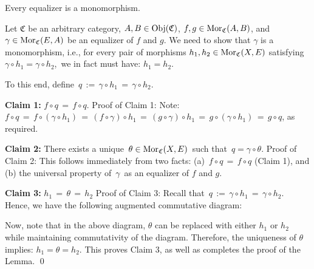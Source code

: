 
\vskip 0.5cm
\begin{lemma}\label{EqualizersAreMonomorphisms}
\mbox{}
\vskip 0.1cm
\noindent
Every equalizer is a monomorphism.
\end{lemma}
\proof
Let $\mathfrak{C}$ be an arbitrary category, $A, B \in \textnormal{Obj}(\mathfrak{C})$, $f, g \in \textnormal{Mor}_{\mathfrak{C}}(A,B)$, and
$\gamma \in \textnormal{Mor}_{\mathfrak{C}}(E,A)$ be an equalizer of $f$ and $g$.
We need to show that $\gamma$ is a monomorphism, i.e.,
for every pair of morphisms $h_{1}, h_{2} \in \textnormal{Mor}_{\mathfrak{C}}(X,E)$
satisfying \,$\gamma \circ h_{1} = \gamma \circ h_{2}$,\,
we in fact must have: $h_{1} = h_{2}$.

\vskip 0.3cm
\noindent
To this end, define \,$q \,:=\, \gamma \circ h_{1} \,=\, \gamma \circ h_{2}$.\,

\vskip 0.3cm
\noindent
\textbf{Claim 1:}\; $f \circ q \,=\, f \circ q$.
\vskip 0.1cm
\noindent
Proof of Claim 1:\;
Note: $f \circ q \,=\, f \circ (\gamma \circ h_{1}) \,=\, (f \circ \gamma) \circ h_{1} \,=\, (g \circ \gamma) \circ h_{1} \,=\, g \circ (\gamma \circ h_{1}) \,=\, g \circ q$, as required.

\vskip 0.3cm
\noindent
\textbf{Claim 2:}\;\; There exists a unique \,$\theta \in \textnormal{Mor}_{\mathfrak{C}}(X,E)$\, such that \,$q = \gamma \circ \theta$.
\vskip 0.1cm
\noindent
Proof of Claim 2:\;
This follows immediately from two facts:
(a)	\,$f \circ q \,=\, f \circ q$ (Claim 1), and
(b)	the universal property of \,$\gamma$\, as an equalizer of $f$ and $g$.
\begin{center}
\end{center}

\vskip 0.3cm
\noindent
\textbf{Claim 3:}\;\;  $h_{1} \,=\, \theta \,=\, h_{2}$
\vskip 0.1cm
\noindent
Proof of Claim 3:\;
Recall that \,$q \,:=\, \gamma \circ h_{1} \,=\, \gamma \circ h_{2}$.\,
Hence, we have the following augmented commutative diagram:
\begin{center}
\end{center}
Now, note that in the above diagram,
$\theta$ can be replaced with either $h_{1}$ or $h_{2}$ while maintaining commutativity of the diagram.
Therefore, the uniqueness of $\theta$ implies: $h_{1} = \theta = h_{2}$.
This proves Claim 3, as well as completes the proof of the Lemma.
\qed

